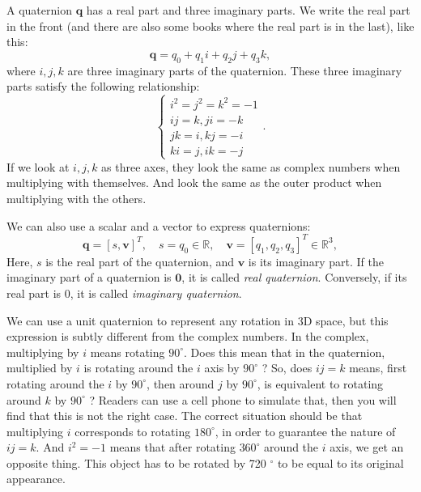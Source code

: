 A quaternion $ \mathbf{q} $ has a real part and three imaginary parts. We write the real part in the front (and there are also some books where the real part is in the last), like this:
\begin{equation}
\mathbf{q} = q_0 + q_1 i + q_2 j + q_3 k,
\end{equation}
where $ i,j,k $ are three imaginary parts of the quaternion. These three imaginary parts satisfy the following relationship:
\begin{equation}
\label{eq:quaternionVirtual}
\left\{ \begin{array}{l}
{i^2} = {j^2} = {k^2} =  - 1\\
ij = k, ji = - k \\
jk = i,kj =  - i\\
ki = j, ik = - j
\end{array} \right. .
\end{equation}
If we look at $ i, j, k $ as three axes, they look the same as complex numbers when multiplying with themselves. And look the same as the outer product when multiplying with the others. 

We can also use a scalar and a vector to express quaternions:
\[
\mathbf{q} = \left[ s, \mathbf{v} \right]^T, \quad s=q_0 \in \mathbb{R},\quad \mathbf{v} = [q_1, q_2, q_3]^T \in \mathbb{R}^3,
\]
Here, $ s $ is the real part of the quaternion, and $ \mathbf {v} $ is its imaginary part. If the imaginary part of a quaternion is $ \mathbf {0} $, it is called \textit{real quaternion}. Conversely, if its real part is $ 0 $, it is called \textit{imaginary quaternion}.

We can use a unit quaternion to represent any rotation in 3D space, but this expression is subtly different from the complex numbers. In the complex, multiplying by $ i $ means rotating $ 90 ^ \circ $. Does this mean that in the quaternion, multiplied by $ i $ is rotating around the $ i $ axis by $ 90 ^ \circ $ ? So, does $ ij = k $ means, first rotating around the $ i $ by $ 90 ^ \circ $, then around $j$ by $ 90 ^ \circ $, is equivalent to rotating around $ k$ by $ 90 ^ \circ $ ? Readers can use a cell phone to simulate that, then you will find that this is not the right case. The correct situation should be that multiplying $ i $ corresponds to rotating $ 180 ^ \circ $, in order to guarantee the nature of $ ij=k $. And $ i^ 2 =- 1 $ means that after rotating $ 360 ^ \circ $ around the $ i $ axis, we get an opposite thing. This object has to be rotated by 720 $^\circ$ to be equal to its original appearance.

